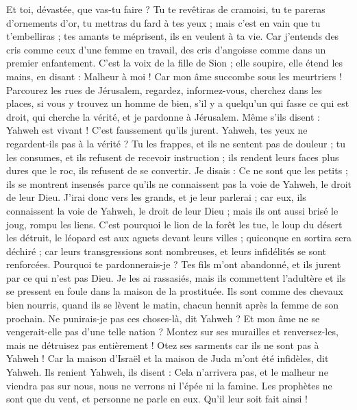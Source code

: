 \begin{multicols}{2}
Et toi, dévastée, que vas-tu faire ? Tu te revêtiras de cramoisi, tu te pareras d'ornements d'or, tu mettras du fard à tes yeux ; mais c’est en vain que tu t'embelliras ; tes amants te méprisent, ils en veulent à ta vie.
Car j'entends des cris comme ceux d'une femme en travail, des cris d’angoisse comme dans un premier enfantement. C’est la voix de la fille de Sion ; elle soupire, elle étend les mains, en disant : Malheur à moi ! Car mon âme succombe sous les meurtriers !
\VerseOne{}Parcourez les rues de Jérusalem, regardez, informez-vous, cherchez dans les places, si vous y trouvez un homme de bien, s'il y a quelqu'un qui fasse ce qui est droit, qui cherche la vérité, et je pardonne à Jérusalem.
Même s'ils disent : Yahweh est vivant ! C’est faussement qu’ils jurent.
Yahweh, tes yeux ne regardent-ils pas à la vérité ? Tu les frappes, et ils ne sentent pas de douleur ; tu les consumes, et ils refusent de recevoir instruction ; ils rendent leurs faces plus dures que le roc, ils refusent de se convertir.
Je disais : Ce ne sont que les petits ; ils se montrent insensés parce qu'ils ne connaissent pas la voie de Yahweh, le droit de leur Dieu.
J’irai donc vers les grands, et je leur parlerai ; car eux, ils connaissent la voie de Yahweh, le droit de leur Dieu ; mais ils ont aussi brisé le joug, rompu les liens.
C'est pourquoi le lion de la forêt les tue, le loup du désert les détruit, le léopard est aux aguets devant leurs villes ; quiconque en sortira sera déchiré ; car leurs transgressions sont nombreuses, et leurs infidélités se sont renforcées.
Pourquoi te pardonnerais-je ? Tes fils m'ont abandonné, et ils jurent par ce qui n’est pas Dieu. Je les ai rassasiés, mais ils commettent l’adultère et ils se pressent en foule dans la maison de la prostituée.
Ils sont comme des chevaux bien nourris, quand ils se lèvent le matin, chacun hennit après la femme de son prochain.
Ne punirais-je pas ces choses-là, dit Yahweh ? Et mon âme ne se vengerait-elle pas d'une telle nation ?
Montez sur ses murailles et renversez-les, mais ne détruisez pas entièrement ! Otez ses sarments car ils ne sont pas à Yahweh !
Car la maison d'Israël et la maison de Juda m’ont été infidèles, dit Yahweh.
Ils renient Yahweh, ils disent : Cela n'arrivera pas, et le malheur ne viendra pas sur nous, nous ne verrons ni l'épée ni la famine.
Les prophètes ne sont que du vent, et personne ne parle en eux. Qu’il leur soit fait ainsi !

\end{multicols}
